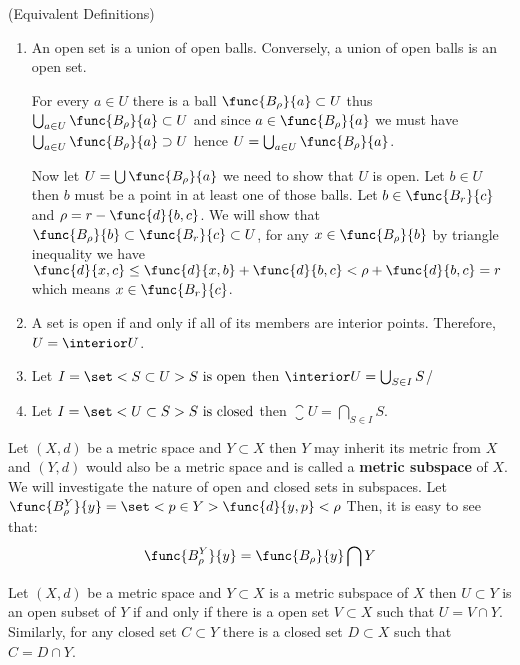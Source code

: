 \begin{remark} (Equivalent Definitions)
    \begin{enumerate}
        \item An open set is a union of open balls. Conversely, a union of open balls is an open set.
              \begin{prooflemma}
                  For every \(a \in U\) there is a ball \(\func{B_\rho}{a} \subset U\) thus \(\bigcup_{a \in U}{\func{B_\rho}{a}} \subset U\) and since \(a \in \func{B_\rho}{a}\) we must have \(\bigcup_{a \in U}{\func{B_\rho}{a}} \supset U\) hence \(U = \bigcup_{a \in U}{\func{B_\rho}{a}}\).

                  Now let \(U = \bigcup {\func{B_\rho}{a}}\) we need to show that \(U\) is open. Let \(b \in U\) then \(b\) must be a point in at least one of those balls. Let \(b \in \func{B_r}{c}\) and \(\rho = r - \func{d}{b,c}\). We will show that \(\func{B_{\rho}}{b} \subset \func{B_r}{c} \subset U\), for any \(x \in \func{B_{\rho}}{b}\) by triangle inequality we have \(\func{d}{x,c} \leq \func{d}{x,b} + \func{d}{b,c} < \rho + \func{d}{b,c} = r\) which means \(x \in \func{B_r}{c}\).
              \end{prooflemma}
        \item A set is open if and only if all of its members are interior points. Therefore, \(U = \interior U\).
        \item Let \(I = \set< S \subset U>{ S \text{ is open}}\) then \(\interior U =  \bigcup_{S \in I} S\)/
        \item Let \(I = \set< U \subset S >{S \text{ is closed}}\) then \(\closure U =  \bigcap_{S \in I} S\).
    \end{enumerate}
\end{remark}

Let \((X,d)\) be a metric space and \(Y \subset X\) then \(Y\) may inherit its metric from \(X\) and \((Y,d)\) would also be a metric space and is called a \textbf{metric subspace} of \(X\). We will investigate the nature of open and closed sets in subspaces. Let \(\func{B_\rho^Y}{y} = \set< p \in Y >{ \func{d}{y,p} < \rho}\) Then, it is easy to see that:
\begin{equation*} 
    \func{B_\rho^Y}{y} = \func{B_{\rho}}{y} \bigcap Y
\end{equation*}

\begin{corollary} \label{InheritancePrinciple}
    Let \((X,d)\) be a metric space and \(Y \subset X\) is a metric subspace of \(X\) then \(U \subset Y\) is an open subset of \(Y\) if and only if there is a open set \(V \subset X\) such that \(U = V \cap Y\). Similarly, for any closed set \(C \subset Y\) there is a closed set \(D \subset X\) such that \(C = D \cap Y\).
\end{corollary}

